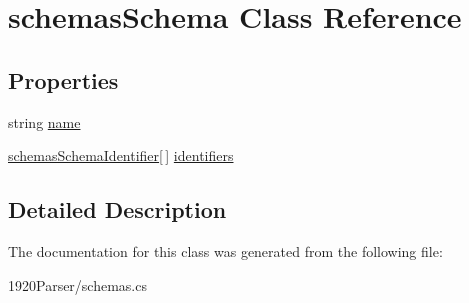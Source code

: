 \hypertarget{classschemas_schema}{}\section{schemas\+Schema Class Reference}
\label{classschemas_schema}


 


\subsection*{Properties}
\begin{DoxyCompactItemize}
\item 
string \hyperlink{classschemas_schema_ade6edd95fc90d8c67e0c0bfe34388a79}{name}\hypertarget{classschemas_schema_ade6edd95fc90d8c67e0c0bfe34388a79}{}\label{classschemas_schema_ade6edd95fc90d8c67e0c0bfe34388a79}

\item 
\hyperlink{classschemas_schema_identifier}{schemas\+Schema\+Identifier}\mbox{[}$\,$\mbox{]} \hyperlink{classschemas_schema_aa0f4c1fca6a4bc1a6e01d0f545a4a241}{identifiers}\hypertarget{classschemas_schema_aa0f4c1fca6a4bc1a6e01d0f545a4a241}{}\label{classschemas_schema_aa0f4c1fca6a4bc1a6e01d0f545a4a241}

\end{DoxyCompactItemize}


\subsection{Detailed Description}


The documentation for this class was generated from the following file\+:\begin{DoxyCompactItemize}
\item 
1920\+Parser/schemas.\+cs\end{DoxyCompactItemize}
